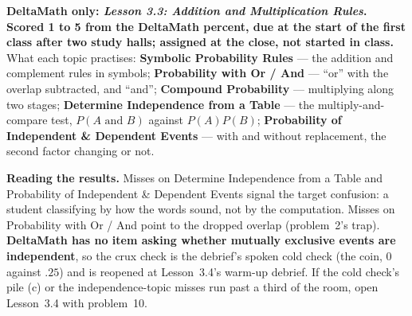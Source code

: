 \documentclass[10pt]{article}
\begin{document}
\begin{teachernote}[Homework]
\textbf{DeltaMath only: \emph{Lesson 3.3: Addition and Multiplication Rules}. Scored 1 to 5 from
the DeltaMath percent, due at the start of the first class after two study halls; assigned at the
close, not started in class.} What each topic practises: \textbf{Symbolic Probability Rules} ---
the addition and complement rules in symbols; \textbf{Probability with Or / And} --- ``or'' with
the overlap subtracted, and ``and''; \textbf{Compound Probability} --- multiplying along two
stages; \textbf{Determine Independence from a Table} --- the multiply-and-compare test,
$P(A \text{ and } B)$ against $P(A)P(B)$; \textbf{Probability of Independent \& Dependent
Events} --- with and without replacement, the second factor changing or not.

\textbf{Reading the results.} Misses on Determine Independence from a Table and Probability of
Independent \& Dependent Events signal the target confusion: a student classifying by how the
words sound, not by the computation. Misses on Probability with Or / And point to the dropped
overlap (problem~2's trap). \textbf{DeltaMath has no item asking whether mutually exclusive events
are independent}, so the crux check is the debrief's spoken cold check (the coin, $0$ against
$.25$) and is reopened at Lesson~3.4's warm-up debrief. If the cold check's pile (c) or the
independence-topic misses run past a third of the room, open Lesson~3.4 with problem~10.
\end{teachernote}
\end{document}

